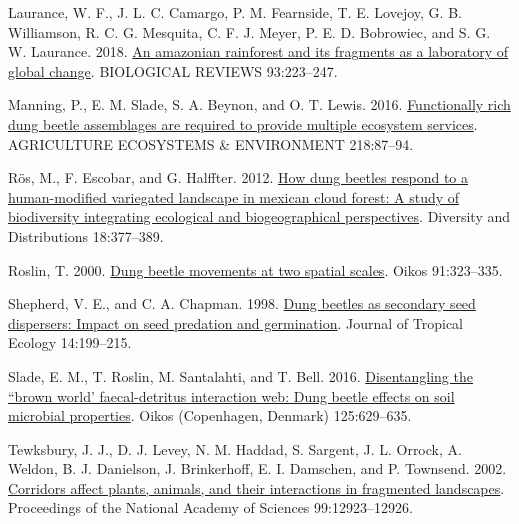 \documentclass[
]{article}
\newlength{\cslhangindent}
\newlength{\cslentryspacingunit} %
\newenvironment{CSLReferences}[2] %
 {%
  \setlength{\parindent}{0pt}
  \ifodd #1
  \let\oldpar\par
  \def\par{\hangindent=\cslhangindent\oldpar}
  \fi
  \setlength{\parskip}{#2\cslentryspacingunit}
 }%
 {}
\begin{document}
\begin{CSLReferences}{1}{0}
\leavevmode{}%
Laurance, W. F., J. L. C. Camargo, P. M. Fearnside, T. E. Lovejoy, G. B.
Williamson, R. C. G. Mesquita, C. F. J. Meyer, P. E. D. Bobrowiec, and
S. G. W. Laurance. 2018. \href{https://doi.org/10.1111/brv.12343}{An
amazonian rainforest and its fragments as a laboratory of global
change}. {BIOLOGICAL} {REVIEWS} 93:223--247.

\leavevmode{}%
Manning, P., E. M. Slade, S. A. Beynon, and O. T. Lewis. 2016.
\href{https://doi.org/10.1016/j.agee.2015.11.007}{Functionally rich dung
beetle assemblages are required to provide multiple ecosystem services}.
{AGRICULTURE} {ECOSYSTEMS} \& {ENVIRONMENT} 218:87--94.

\leavevmode{}%
Rös, M., F. Escobar, and G. Halffter. 2012.
\href{https://doi.org/10.1111/j.1472-4642.2011.00834.x}{How dung beetles
respond to a human-modified variegated landscape in mexican cloud
forest: A study of biodiversity integrating ecological and
biogeographical perspectives}. Diversity and Distributions 18:377--389.

\leavevmode{}%
Roslin, T. 2000.
\href{https://doi.org/10.1034/j.1600-0706.2000.910213.x}{Dung beetle
movements at two spatial scales}. Oikos 91:323--335.

\leavevmode{}%
Shepherd, V. E., and C. A. Chapman. 1998.
\href{https://doi.org/10.1017/S0266467498000169}{Dung beetles as
secondary seed dispersers: Impact on seed predation and germination}.
Journal of Tropical Ecology 14:199--215.

\leavevmode{}%
Slade, E. M., T. Roslin, M. Santalahti, and T. Bell. 2016.
\href{https://doi.org/10.1111/oik.02640}{Disentangling the ``brown
world' faecal-detritus interaction web: Dung beetle effects on soil
microbial properties}. Oikos (Copenhagen, Denmark) 125:629--635.

\leavevmode{}%
Tewksbury, J. J., D. J. Levey, N. M. Haddad, S. Sargent, J. L. Orrock,
A. Weldon, B. J. Danielson, J. Brinkerhoff, E. I. Damschen, and P.
Townsend. 2002. \href{https://doi.org/10.1073/pnas.202242699}{Corridors
affect plants, animals, and their interactions in fragmented
landscapes}. Proceedings of the National Academy of Sciences
99:12923--12926.

\end{CSLReferences}
\end{document}
